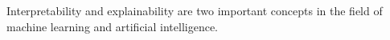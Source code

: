 
Interpretability and explainability are two important concepts in the field of machine learning and artificial intelligence.

